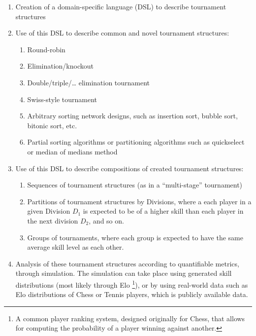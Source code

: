 \documentclass[a4,11pt,twoside,final]{article}
\begin{document}
\begin{enumerate}
\item Creation of a domain-specific language (DSL) to describe tournament structures

\item Use of this DSL to describe common and novel tournament structures:
\begin{enumerate}
\item Round-robin
\item Elimination/knockout
\item Double/triple/\ldots{} elimination tournament
\item Swiss-style tournament
\item Arbitrary sorting network designs, such as insertion sort, bubble sort,
bitonic sort, etc.
\item Partial sorting algorithms or partitioning algorithms such as quickselect
or median of medians method
\end{enumerate}

\item Use of this DSL to describe compositions of created tournament structures:
\begin{enumerate}
\item Sequences of tournament structures (as in a ``multi-stage'' tournament)
\item Partitions of tournament structures by Divisions, where a each player in a
given Division \(D_1\) is expected to be of a higher skill than each player
in the next division \(D_2\), and so on.
\item Groups of tournaments, where each group is expected to have the same
average skill level as each other.
\end{enumerate}

\item Analysis of these tournament structures according to quantifiable metrics,
through simulation. The simulation can take place using generated skill
distributions (most likely through Elo \footnote{A common player ranking system,
designed originally for Chess, that allows for computing the probability of a
player winning against another.}), or by using real-world data such as Elo
distributions of Chess or Tennis players, which is publicly available data.


\end{enumerate}
\end{document}
